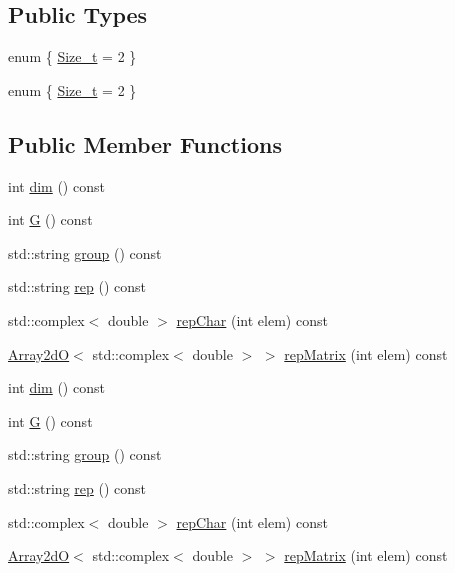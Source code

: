 \subsection*{Public Types}
\begin{DoxyCompactItemize}
\item 
enum \{ \mbox{\hyperlink{structHadron_1_1C4nm0ERep_aeee227edabcc13d76770a58798294030acf71851a7fd569fd345eb94484bf3ea8}{Size\+\_\+t}} = 2
 \}
\item 
enum \{ \mbox{\hyperlink{structHadron_1_1C4nm0ERep_aeee227edabcc13d76770a58798294030acf71851a7fd569fd345eb94484bf3ea8}{Size\+\_\+t}} = 2
 \}
\end{DoxyCompactItemize}
\subsection*{Public Member Functions}
\begin{DoxyCompactItemize}
\item 
int \mbox{\hyperlink{structHadron_1_1C4nm0ERep_ad264e17a212eb7e2cf71ba25f16caa06}{dim}} () const
\item 
int \mbox{\hyperlink{structHadron_1_1C4nm0ERep_aeed131ece7b7c5203a64ac3591c75f59}{G}} () const
\item 
std\+::string \mbox{\hyperlink{structHadron_1_1C4nm0ERep_a0d17268ef31fa011daabf7af62deec34}{group}} () const
\item 
std\+::string \mbox{\hyperlink{structHadron_1_1C4nm0ERep_a7f4628e8d080d5552176c65fcbd66e84}{rep}} () const
\item 
std\+::complex$<$ double $>$ \mbox{\hyperlink{structHadron_1_1C4nm0ERep_ae2587ec63f886eaafedfaede40ebdba5}{rep\+Char}} (int elem) const
\item 
\mbox{\hyperlink{classADAT_1_1Array2dO}{Array2dO}}$<$ std\+::complex$<$ double $>$ $>$ \mbox{\hyperlink{structHadron_1_1C4nm0ERep_aa9353c0f2a226224911c51db6f647ccf}{rep\+Matrix}} (int elem) const
\item 
int \mbox{\hyperlink{structHadron_1_1C4nm0ERep_ad264e17a212eb7e2cf71ba25f16caa06}{dim}} () const
\item 
int \mbox{\hyperlink{structHadron_1_1C4nm0ERep_aeed131ece7b7c5203a64ac3591c75f59}{G}} () const
\item 
std\+::string \mbox{\hyperlink{structHadron_1_1C4nm0ERep_a0d17268ef31fa011daabf7af62deec34}{group}} () const
\item 
std\+::string \mbox{\hyperlink{structHadron_1_1C4nm0ERep_a7f4628e8d080d5552176c65fcbd66e84}{rep}} () const
\item 
std\+::complex$<$ double $>$ \mbox{\hyperlink{structHadron_1_1C4nm0ERep_ae2587ec63f886eaafedfaede40ebdba5}{rep\+Char}} (int elem) const
\item 
\mbox{\hyperlink{classADAT_1_1Array2dO}{Array2dO}}$<$ std\+::complex$<$ double $>$ $>$ \mbox{\hyperlink{structHadron_1_1C4nm0ERep_aa9353c0f2a226224911c51db6f647ccf}{rep\+Matrix}} (int elem) const
\end{DoxyCompactItemize}


